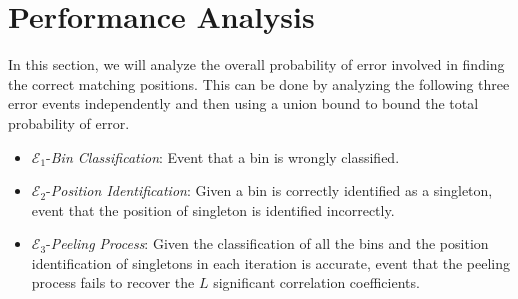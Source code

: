 \section{Performance Analysis}
\label{sec:analysis}
\def\vgap{2pt}
In this section, we will analyze the overall probability of error involved in finding the correct matching positions. This can be done by analyzing the following three error events independently and then using a union bound to bound the total probability of error.

\begin{itemize}
	\item $\mathcal{E}_1${-\it Bin Classification}: Event that a bin is wrongly classified.
	\item $\mathcal{E}_2${-\it Position Identification}: Given a bin is correctly identified as a singleton, event that the position of singleton is identified incorrectly.
	\item $\mathcal{E}_3${-\it Peeling Process}: Given the classification of all the bins and the position identification of singletons in each iteration is accurate, event that the peeling process fails to recover the $L$ significant correlation coefficients.
\end{itemize}

